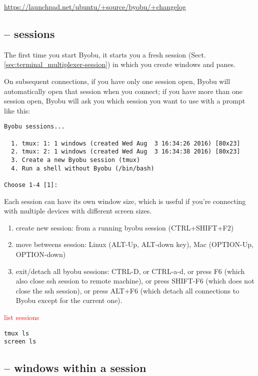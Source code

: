 \url{https://launchpad.net/ubuntu/+source/byobu/+changelog}




\subsection{-- sessions}
\label{sec:byobu-sessions}

The first time you start Byobu, it starts you a fresh session
(Sect.\ref{sec:terminal_multiplexer-session}) in which you create windows and
panes.

On subsequent connections, if you have only one session open, Byobu will
automatically open that session when you connect; if you have more than one
session open, Byobu will ask you which session you want to use with a prompt
like this:
\begin{verbatim}
Byobu sessions...

  1. tmux: 1: 1 windows (created Wed Aug  3 16:34:26 2016) [80x23]
  2. tmux: 2: 1 windows (created Wed Aug  3 16:34:38 2016) [80x23]
  3. Create a new Byobu session (tmux)
  4. Run a shell without Byobu (/bin/bash)

Choose 1-4 [1]: 
\end{verbatim}

Each session can have its own window size, which is useful if you’re connecting
with multiple devices with different screen sizes.

\begin{enumerate}
  \item create new session: from a running byobu session (CTRL+SHIFT+F2)
  
  \item move betweens session: 
  Linux (ALT-Up, ALT-down key), Mac (OPTION-Up, OPTION-down)
  
  
  \item exit/detach all byobu sessions: CTRL-D, or CTRL-a-d, or 
  press F6 (which also close ssh session to remote machine), or 
  press SHIFT-F6 (which does not close the ssh session), or
  press ALT+F6 (which detach all connections to Byobu except for the current one).
  
\end{enumerate}


\textcolor{red}{list sessions}
\begin{verbatim}
tmux ls
screen ls
\end{verbatim}

\subsection{-- windows within a session}

